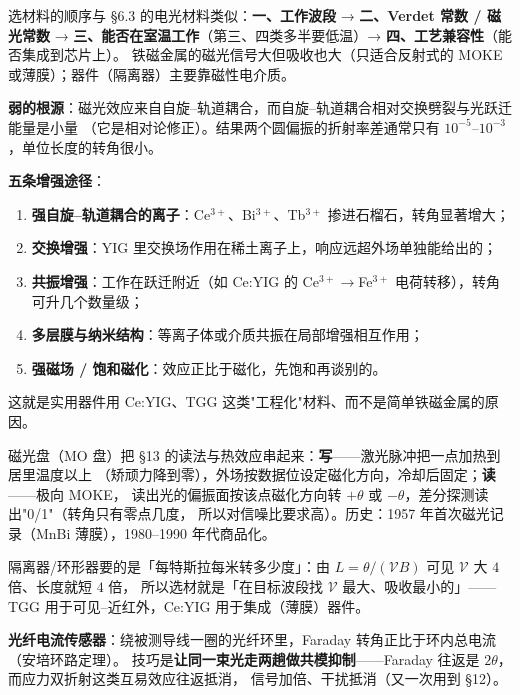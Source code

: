 \documentclass[11pt]{ctexart}
\let\subhdrtheme\subhdr
\renewcommand{\subhdr}[1]{\needspace{3\baselineskip}\subhdrtheme{#1}}
\newcommand{\vdt}{\mathcal{V}}
\begin{document}
选材料的顺序与 §6.3 的电光材料类似：\textbf{一、工作波段} → \textbf{二、Verdet 常数 / 磁光常数}
→ \textbf{三、能否在室温工作}（第三、四类多半要低温）→ \textbf{四、工艺兼容性}（能否集成到芯片上）。
铁磁金属的磁光信号大但吸收也大（只适合反射式的 MOKE 或薄膜）；器件（隔离器）主要靠磁性电介质。


\textbf{弱的根源}：磁光效应来自自旋–轨道耦合，而自旋–轨道耦合相对交换劈裂与光跃迁能量是小量
（它是相对论修正）。结果两个圆偏振的折射率差通常只有 $10^{-5}$--$10^{-3}$，单位长度的转角很小。

\textbf{五条增强途径}：
\begin{enumerate}
\item \textbf{强自旋–轨道耦合的离子}：Ce$^{3+}$、Bi$^{3+}$、Tb$^{3+}$ 掺进石榴石，转角显著增大；
\item \textbf{交换增强}：YIG 里交换场作用在稀土离子上，响应远超外场单独能给出的；
\item \textbf{共振增强}：工作在跃迁附近（如 Ce:YIG 的 Ce$^{3+}\to$Fe$^{3+}$ 电荷转移），转角可升几个数量级；
\item \textbf{多层膜与纳米结构}：等离子体或介质共振在局部增强相互作用；
\item \textbf{强磁场 / 饱和磁化}：效应正比于磁化，先饱和再谈别的。
\end{enumerate}
这就是实用器件用 Ce:YIG、TGG 这类"工程化"材料、而不是简单铁磁金属的原因。


磁光盘（MO 盘）把 §13 的读法与热效应串起来：\textbf{写}——激光脉冲把一点加热到居里温度以上
（矫顽力降到零），外场按数据位设定磁化方向，冷却后固定；\textbf{读}——极向 MOKE，
读出光的偏振面按该点磁化方向转 $+\theta$ 或 $-\theta$，差分探测读出"0/1"（转角只有零点几度，
所以对信噪比要求高）。历史：1957 年首次磁光记录（MnBi 薄膜），1980--1990 年代商品化。


隔离器/环形器要的是「每特斯拉每米转多少度」：由 $L=\theta/(\vdt B)$ 可见 $\vdt$ 大 $4$ 倍、长度就短 $4$ 倍，
所以选材就是「在目标波段找 $\vdt$ 最大、吸收最小的」——TGG 用于可见--近红外，Ce:YIG 用于集成（薄膜）器件。

\textbf{光纤电流传感器}：绕被测导线一圈的光纤环里，Faraday 转角正比于环内总电流（安培环路定理）。
技巧是\textbf{让同一束光走两趟做共模抑制}——Faraday 往返是 $2\theta$，而应力双折射这类互易效应往返抵消，
信号加倍、干扰抵消（又一次用到 §12）。
\end{document}
